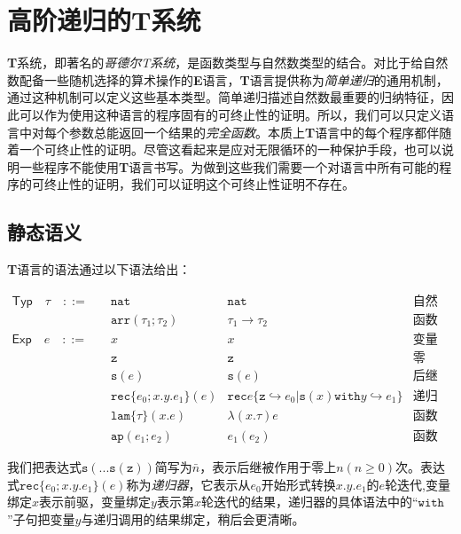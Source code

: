 \chapter{高阶递归的T系统}

\textbf{T}系统，即著名的\textit{哥德尔T系统}，是函数类型与自然数类型的结合。对比于给自然数配备一些随机选择的算术操作的\textbf{E}语言，\textbf{T}语言提供称为\textit{简单递归}的通用机制，通过这种机制可以定义这些基本类型。简单递归描述自然数最重要的归纳特征，因此可以作为使用这种语言的程序固有的可终止性的证明。所以，我们可以只定义语言中对每个参数总能返回一个结果的\textit{完全函数}。本质上\textbf{T}语言中的每个程序都伴随着一个可终止性的证明。尽管这看起来是应对无限循环的一种保护手段，也可以说明一些程序不能使用\textbf{T}语言书写。为做到这些我们需要一个对语言中所有可能的程序的可终止性的证明，我们可以证明这个可终止性证明不存在。

\section{静态语义}

\textbf{T}语言的语法通过以下语法给出：

$$
\begin{array}{llll}
\mathsf{Typ}\quad\tau\quad ::= \quad
    &\mathtt{nat}                   &\mathtt{nat}         &\text{自然数}\\
    &\mathtt{arr}(\tau_1;\tau_2)    &\tau_1\to\tau_2    &\text{函数}\\
\mathsf{Exp}\quad e \quad ::= \quad
    &x             &x             &\text{变量}\\
    &\mathtt{z}    &\mathtt{z}    &\text{零}\\
    &\mathtt{s}(e) &\mathtt{s}(e) &\text{后继}\\
    &\mathtt{rec}\{e_0;x.y.e_1\}(e)    &\mathtt{rec}e\{\mathtt{z} \hookrightarrow e_0 | \mathtt{s}(x) \mathtt{with} y \hookrightarrow e_1 \}    &\text{递归}\\
    &\mathtt{lam}\{\tau\}(x.e)    &\lambda(x.\tau)e    &\text{函数抽象}\\
    &\mathtt{ap}(e_1;e_2)    &e_1(e_2)    &\text{函数应用}
\end{array}
$$

我们把表达式$\mathtt{s}(...\mathtt{s}(\mathtt{z}))$简写为$\bar{n}$，表示后继被作用于零上$n(n\ge0)$次。表达式$\mathtt{rec}\{e_0;x.y.e_1\}(e)$称为\textit{递归器}，它表示从$e_0$开始形式转换$x.y.e_1$的$e$轮迭代,变量绑定$x$表示前驱，变量绑定$y$表示第$x$轮迭代的结果，递归器的具体语法中的“$\mathtt{with}$”子句把变量$y$与递归调用的结果绑定，稍后会更清晰。

